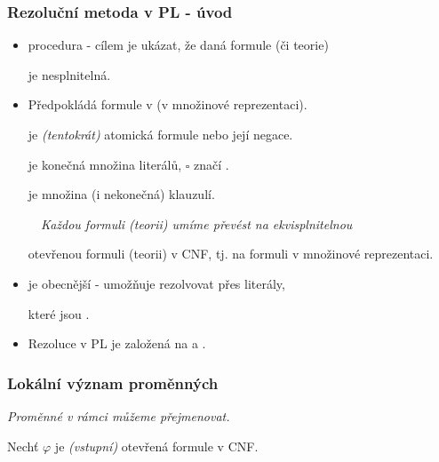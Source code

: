 
\subsubsection*{Rezoluční metoda v PL - úvod}
    
    \begin{itemize}
    \item {} procedura - cílem je ukázat, že daná formule (či teorie)
    \smallskip
    
    je nesplnitelná.
    \smallskip
    
    \item Předpokládá  formule v  (v množinové reprezentaci).
    \medskip
    
     je \emph{(tentokrát)} atomická formule nebo její negace.
    \medskip
    
     je konečná množina literálů, $\square$ značí .
    \medskip
    
     je množina (i nekonečná) klauzulí.
    \medskip
    
    {\it {}\ \ Každou formuli (teorii) umíme převést na ekvisplnitelnou
    \smallskip
    
    otevřenou formuli (teorii) v CNF, tj. na formuli v množinové reprezentaci.}
    \smallskip
    
    \item {} je obecnější - umožňuje rezolvovat přes literály,
    \smallskip
    
    které jsou .
    \smallskip
    
    \item Rezoluce v PL je založená na  a .
    \end{itemize}
    
    
    
    
    \subsubsection*{Lokální význam proměnných}
    {\it Proměnné v rámci  můžeme přejmenovat.}
    \medskip
    
    Nechť $\varphi$ je \emph{(vstupní)} otevřená formule v CNF.
    
